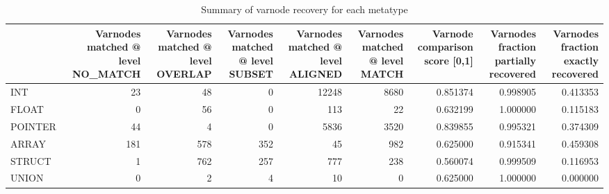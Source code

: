 \begin{table}
\centering
\caption{Summary of varnode recovery for each metatype}
\label{table:metatype-recovery-summary-with-levels}
\begin{tabular}{lrrrrrrrr}
\toprule
{} &  Varnodes matched @ level NO\_MATCH &  Varnodes matched @ level OVERLAP &  Varnodes matched @ level SUBSET &  Varnodes matched @ level ALIGNED &  Varnodes matched @ level MATCH &  Varnode comparison score [0,1] &  Varnodes fraction partially recovered &  Varnodes fraction exactly recovered \\
\midrule
INT     &                                 23 &                                48 &                                0 &                             12248 &                            8680 &                        0.851374 &                               0.998905 &                             0.413353 \\
FLOAT   &                                  0 &                                56 &                                0 &                               113 &                              22 &                        0.632199 &                               1.000000 &                             0.115183 \\
POINTER &                                 44 &                                 4 &                                0 &                              5836 &                            3520 &                        0.839855 &                               0.995321 &                             0.374309 \\
ARRAY   &                                181 &                               578 &                              352 &                                45 &                             982 &                        0.625000 &                               0.915341 &                             0.459308 \\
STRUCT  &                                  1 &                               762 &                              257 &                               777 &                             238 &                        0.560074 &                               0.999509 &                             0.116953 \\
UNION   &                                  0 &                                 2 &                                4 &                                10 &                               0 &                        0.625000 &                               1.000000 &                             0.000000 \\
\bottomrule
\end{tabular}
\end{table}
